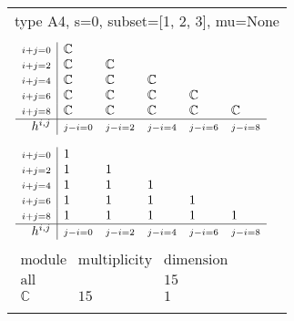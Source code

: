 \documentclass[crop,border=2mm]{standalone}
\begin{document}
\begin{tabular}{l}
{\huge type A4, s=0, subset=[1, 2, 3], mu=None}\\ \\


$\displaystyle
\begin{array}{r|l l l l l}
	{\scriptstyle i+j=0}&\mathbb{C}&&&&\\
	{\scriptstyle i+j=2}&\mathbb{C}&\mathbb{C}&&&\\
	{\scriptstyle i+j=4}&\mathbb{C}&\mathbb{C}&\mathbb{C}&&\\
	{\scriptstyle i+j=6}&\mathbb{C}&\mathbb{C}&\mathbb{C}&\mathbb{C}&\\
	{\scriptstyle i+j=8}&\mathbb{C}&\mathbb{C}&\mathbb{C}&\mathbb{C}&\mathbb{C}\\
	\hline h^{i,j}&{\scriptstyle j-i=0}&{\scriptstyle j-i=2}&{\scriptstyle j-i=4}&{\scriptstyle j-i=6}&{\scriptstyle j-i=8}
\end{array}
$ \\ \\


$\displaystyle
\begin{array}{r|l l l l l}
	{\scriptstyle i+j=0}&1&&&&\\
	{\scriptstyle i+j=2}&1&1&&&\\
	{\scriptstyle i+j=4}&1&1&1&&\\
	{\scriptstyle i+j=6}&1&1&1&1&\\
	{\scriptstyle i+j=8}&1&1&1&1&1\\
	\hline h^{i,j}&{\scriptstyle j-i=0}&{\scriptstyle j-i=2}&{\scriptstyle j-i=4}&{\scriptstyle j-i=6}&{\scriptstyle j-i=8}
\end{array}
$ \\ \\


$\displaystyle
\begin{array}{rll}
	\text{module}&\text{multiplicity}&\text{dimension} \\ \hline \text{all}&&15 \\
	\mathbb{C}&15&1
\end{array}
$ \\ \\

\end{tabular}
\end{document}
